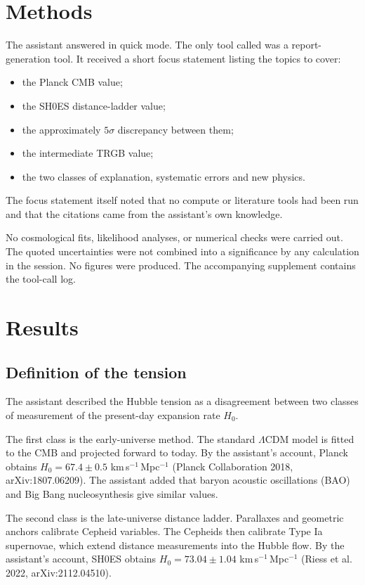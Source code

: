 \documentclass[11pt,a4paper]{article}
\begin{document}
\section{Methods}
The assistant answered in quick mode. The only tool called was a report-generation tool. It received a short focus statement listing the topics to cover:
\begin{itemize}
\item the Planck CMB value;
\item the SH0ES distance-ladder value;
\item the approximately $5\sigma$ discrepancy between them;
\item the intermediate TRGB value;
\item the two classes of explanation, systematic errors and new physics.
\end{itemize}
The focus statement itself noted that no compute or literature tools had been run and that the citations came from the assistant's own knowledge.

No cosmological fits, likelihood analyses, or numerical checks were carried out. The quoted uncertainties were not combined into a significance by any calculation in the session. No figures were produced. The accompanying supplement contains the tool-call log.

\section{Results}
\subsection{Definition of the tension}
The assistant described the Hubble tension as a disagreement between two classes of measurement of the present-day expansion rate $H_0$.

The first class is the early-universe method. The standard $\Lambda$CDM model is fitted to the CMB and projected forward to today. By the assistant's account, Planck obtains $H_0 = 67.4 \pm 0.5$ km\,s$^{-1}$\,Mpc$^{-1}$ (Planck Collaboration 2018, arXiv:1807.06209). The assistant added that baryon acoustic oscillations (BAO) and Big Bang nucleosynthesis give similar values.

The second class is the late-universe distance ladder. Parallaxes and geometric anchors calibrate Cepheid variables. The Cepheids then calibrate Type Ia supernovae, which extend distance measurements into the Hubble flow. By the assistant's account, SH0ES obtains $H_0 = 73.04 \pm 1.04$ km\,s$^{-1}$\,Mpc$^{-1}$ (Riess et al. 2022, arXiv:2112.04510).
\end{document}
